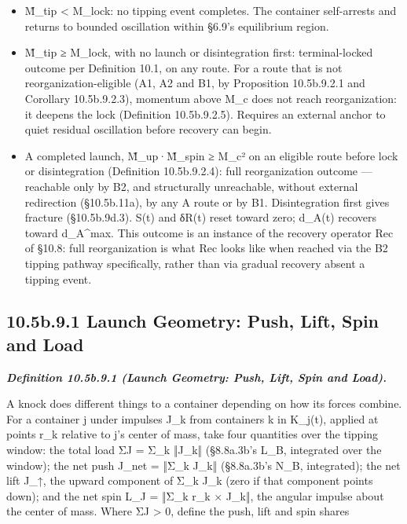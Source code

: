 \documentclass[
]{article}
\begin{document}
\begin{itemize}
\item
  M̃\_tip \textless{} M\_lock: no tipping event completes. The container
  self-arrests and returns to bounded oscillation within §6.9's
  equilibrium region.
\item
  M̃\_tip ≥ M\_lock, with no launch or disintegration first:
  terminal-locked outcome per Definition 10.1, on any route. For a route
  that is not reorganization-eligible (A1, A2 and B1, by Proposition
  10.5b.9.2.1 and Corollary 10.5b.9.2.3), momentum above M\_c does not
  reach reorganization: it deepens the lock (Definition 10.5b.9.2.5).
  Requires an external anchor to quiet residual oscillation before
  recovery can begin.
\item
  A completed launch, M̃\_up·M̃\_spin ≥ M\_c² on an eligible route before
  lock or disintegration (Definition 10.5b.9.2.4): full reorganization
  outcome --- reachable only by B2, and structurally unreachable,
  without external redirection (§10.5b.11a), by any A route or by B1.
  Disintegration first gives fracture (§10.5b.9d.3). S(t) and δR(t)
  reset toward zero; d\_A(t) recovers toward d\_A\^{}max. This outcome
  is an instance of the recovery operator Rec of §10.8: full
  reorganization is what Rec looks like when reached via the B2 tipping
  pathway specifically, rather than via gradual recovery absent a
  tipping event.
\end{itemize}

\hypertarget{b.9.1-launch-geometry-push-lift-spin-and-load}{%
\subsection{10.5b.9.1 Launch Geometry: Push, Lift, Spin and
Load}\label{b.9.1-launch-geometry-push-lift-spin-and-load}}

\emph{\textbf{Definition 10.5b.9.1 (Launch Geometry: Push, Lift, Spin
and Load).}}

A knock does different things to a container depending on how its forces
combine. For a container j under impulses J\_k from containers k in
K\_j(t), applied at points r\_k relative to j's center of mass, take
four quantities over the tipping window: the total load ΣJ = Σ\_k ‖J\_k‖
(§8.8a.3b's L\_B, integrated over the window); the net push J\_net =
‖Σ\_k J\_k‖ (§8.8a.3b's N\_B, integrated); the net lift J\_↑, the upward
component of Σ\_k J\_k (zero if that component points down); and the net
spin L\_J = ‖Σ\_k r\_k × J\_k‖, the angular impulse about the center of
mass. Where ΣJ \textgreater{} 0, define the push, lift and spin shares
\end{document}
